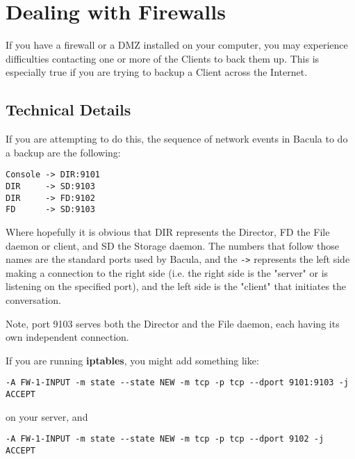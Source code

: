 
\chapter{Dealing with Firewalls}
\label{FirewallsChapter}

If you have a firewall or a DMZ installed on your computer, you may experience
difficulties contacting one or more of the Clients to back them up. This is
especially true if you are trying to backup a Client across the Internet.

\section{Technical Details}

If you are attempting to do this, the sequence of network events in Bacula to
do a backup are the following:

\footnotesize
\begin{verbatim}
Console -> DIR:9101
DIR     -> SD:9103
DIR     -> FD:9102
FD      -> SD:9103
\end{verbatim}
\normalsize

Where hopefully it is obvious that DIR represents the Director, FD the File
daemon or client, and SD the Storage daemon. The numbers that follow those
names are the standard ports used by Bacula, and the \verb:->: represents the
left side making a connection to the right side (i.e. the right side is the
"server" or is listening on the specified port), and the left side is the
"client" that initiates the conversation.

Note, port 9103 serves both the Director and the File daemon, each having its
own independent connection.

If you are running {\bf iptables}, you might add something like:

\footnotesize
\begin{verbatim}
-A FW-1-INPUT -m state --state NEW -m tcp -p tcp --dport 9101:9103 -j ACCEPT
\end{verbatim}
\normalsize

on your server, and

\footnotesize
\begin{verbatim}
-A FW-1-INPUT -m state --state NEW -m tcp -p tcp --dport 9102 -j ACCEPT
\end{verbatim}
\normalsize

